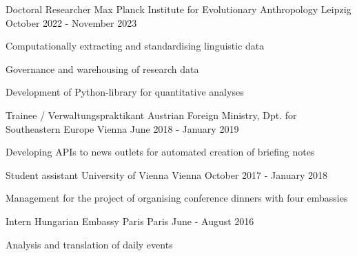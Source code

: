 \begin{cventries}

  \cventry
    {Doctoral Researcher} %
    {Max Planck Institute for Evolutionary Anthropology} %
    {Leipzig} %
    {October 2022 - November 2023} %
    {
      \begin{cvitems} %
      \item{Computationally extracting and standardising linguistic data}
      \item{Governance and warehousing of research data}
      \item{Development of Python-library for quantitative analyses}
      \end{cvitems}
    }
    
  \cventry
    {Trainee / Verwaltungspraktikant} %
    {Austrian Foreign Ministry, Dpt. for Southeastern Europe} %
    {Vienna} %
    {June 2018 - January 2019} %
    {
      \begin{cvitems} %
        \item{Developing APIs to news outlets for automated creation of briefing notes}
      \end{cvitems}
    }

  \cventry
    {Student assistant} %
    {University of Vienna} %
    {Vienna} %
    {October 2017 - January 2018} %
    {
    \begin{cvitems}
    \item{Management for the project of organising conference dinners with four embassies}
    \end{cvitems}
    }
    
  \cventry
    {Intern} %
    {Hungarian Embassy Paris} %
    {Paris} %
    {June - August 2016} %
    {
    \begin{cvitems}
    \item{Analysis and translation of daily events}
    \end{cvitems}
    }
    
\end{cventries}

